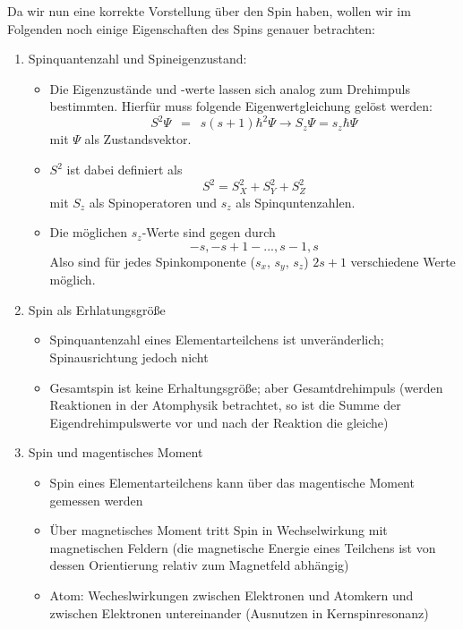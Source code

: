 \documentclass{article}
\newcommand{\widespace}{\enspace}
\newcommand{\wideeq}{\widespace = \widespace}
\begin{document}
Da wir nun eine korrekte Vorstellung über den Spin haben, wollen wir  im Folgenden noch einige Eigenschaften des Spins genauer betrachten:
\begin{enumerate}
    \item Spinquantenzahl und Spineigenzustand:
        \begin{itemize}
            \item Die Eigenzustände und -werte lassen sich analog zum Drehimpuls bestimmten. Hierfür muss folgende Eigenwertgleichung gelöst werden:
            \[
                S^2 \Psi \wideeq s (s + 1) \hbar^2 \Psi \to S_z \Psi = s_z \hbar \Psi
            \]
            mit $\Psi$ als Zustandsvektor.
            \item $S^2$ ist dabei definiert als
            \[
                S^2 = S_X^2+S_Y^2+S_Z^2
            \]
            mit $S_{z}$ als Spinoperatoren und $s_{z}$ als Spinquntenzahlen.
            \item Die möglichen $s_z$-Werte sind gegen durch
            \[
                -s,-s+1-...,s-1,s
            \]
            Also sind für jedes Spinkomponente ($s_x$, $s_y$, $s_z$) $2s+1$ verschiedene Werte möglich.
        \end{itemize}
    \item Spin als Erhlatungsgröße
        \begin{itemize}
            \item Spinquantenzahl eines Elementarteilchens ist unveränderlich; Spinausrichtung jedoch nicht
            \item Gesamtspin ist keine Erhaltungsgröße; aber Gesamtdrehimpuls (werden Reaktionen in der Atomphysik betrachtet, so ist die Summe der Eigendrehimpulswerte vor und nach der Reaktion die gleiche)
        \end{itemize}
    \item Spin und magentisches Moment
        \begin{itemize}
            \item Spin eines Elementarteilchens kann über das magentische Moment gemessen werden
            \item Über magnetisches Moment tritt Spin in Wechselwirkung mit magnetischen Feldern (die magnetische Energie eines Teilchens ist von dessen Orientierung relativ zum Magnetfeld abhängig)
            \item Atom: Wecheslwirkungen zwischen Elektronen und Atomkern und zwischen Elektronen untereinander (Ausnutzen in Kernspinresonanz)
        \end{itemize}  
    \end{enumerate}
\end{document}
